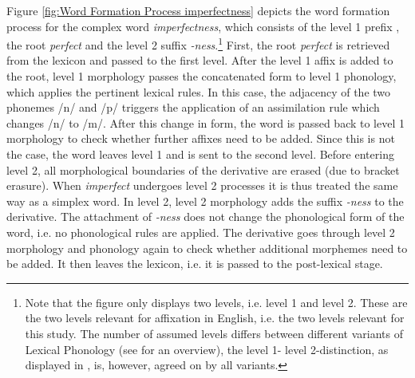 Figure \ref{fig:Word Formation Process imperfectness} depicts the word formation process for the complex word \textit{imperfectness}, which consists of the level 1 prefix , the root \textit{perfect} and the level 2 suffix \textit{-ness}.\footnote{Note that the figure only displays two levels, i.e. level 1 and level 2. These are the two levels relevant for affixation in English, i.e. the two levels relevant for this study. The number of assumed levels differs between different variants of Lexical Phonology (see \citealt{Giegerich.1999} for an overview), the level 1- level 2-distinction, as displayed in , is, however, agreed on by all variants.}
First, the root \textit{perfect} is retrieved from the lexicon and passed to the first level. After the level 1 affix  is added to the root, level 1 morphology passes the concatenated form to level 1 phonology, which applies the pertinent lexical rules. In this case, the adjacency of the two phonemes /n/ and /p/ triggers the application of an assimilation rule which changes /n/ to /m/. After this change in form, the word is passed back to level 1 morphology to check whether further affixes need to be added. Since this is not the case, the word leaves level 1 and is sent to the second level. 
Before entering level 2, all morphological boundaries of the derivative are erased (due to bracket erasure). When \textit{imperfect} undergoes level 2 processes it is thus treated the same way as a simplex word.  
In level 2, level 2 morphology adds the suffix \textit{-ness} to the derivative. The attachment of \textit{-ness} does not change the phonological form of the word, i.e. no phonological rules are applied. The derivative goes through level 2 morphology and phonology again to check whether additional morphemes need to be added. It then leaves the lexicon, i.e. it is passed to the post-lexical stage.\\

